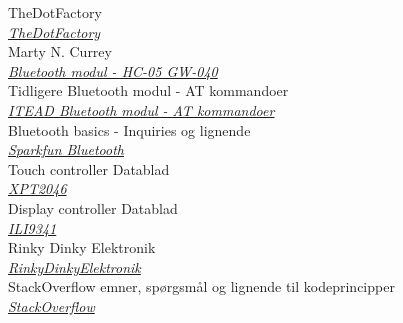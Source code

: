 \documentclass[12pt]{article}
\renewcommand{\refname}{whatever}
\begin{document}











\renewcommand\refname{References}
\begin{thebibliography}{9}
	 TheDotFactory \\
	\textit{\href{http://www.eran.io/the-dot-factory-an-lcd-font-and-image-generator/}{TheDotFactory}}\\ 
	
	Marty N. Currey \\
	\textit{\href{http://www.martyncurrey.com/arduino-with-hc-05-bluetooth-module-at-mode}{Bluetooth modul - HC-05 GW-040}
	}	\\

	Tidligere Bluetooth modul - AT kommandoer \\
	\textit{\href{http://store.iteadstudio.com/images/produce/Shield/BTshieldv2.2/BTShieldV2.2_DS.pdf}{ITEAD Bluetooth modul - AT kommandoer}
	}	\\

	Bluetooth basics - Inquiries og lignende \\
	\textit{\href{https://learn.sparkfun.com/tutorials/bluetooth-basics}{Sparkfun Bluetooth}
	}	\\
	
	Touch controller Datablad \\
	\textit{\href{https://www.buydisplay.com/download/ic/XPT2046.pdf}{XPT2046}
	}\\
	
	Display controller Datablad \\
	\textit{\href{https://cdn-shop.adafruit.com/datasheets/ILI9341.pdf}{ILI9341}
	}	\\
	Rinky Dinky Elektronik \\
	\textit{\href{http://www.rinkydinkelectronics.com/library.php}{RinkyDinkyElektronik}
	}	\\

	StackOverflow emner, spørgsmål og lignende til kodeprincipper \\
	\textit{\href{stackoverflow.com}{StackOverflow}
	}	\\

	
\end{thebibliography}
\end{document}
